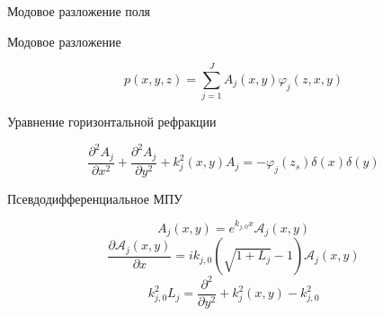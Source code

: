 \documentclass[10pt, unicode]{beamer}
\newif\ifmetropolis
\newcommand{\pa}[1]{\left(#1\right)}
\begin{document}
    \begin{frame}[fragile]{Модовое разложение поля}
        \begin{block}{Модовое разложение}
            \ifmetropolis
                \smallskip
            \fi
            \begin{equation}
                p\pa{x,y,z}=\sum\limits_{j=1}^JA_j\pa{x,y}\varphi_j\pa{z,x,y}
            \end{equation}
        \end{block}
        \begin{block}{Уравнение горизонтальной рефракции}
            \ifmetropolis
                \smallskip
            \fi
            \begin{equation}
                \frac{\partial^2 A_j}{\partial x^2} + \frac{\partial^2 A_j}{\partial y^2}+k_j^2 (x,y)A_j=-\varphi_j(z_s)\delta(x)\delta(y)
            \end{equation}
        \end{block}
        \begin{block}{Псевдодифференциальное МПУ}
            \ifmetropolis
                \smallskip
            \fi
            \begin{equation}
                A_j\pa{x,y}=e^{k_{j,0}x}\mathcal{A}_j\pa{x,y}
            \end{equation}
            \begin{equation}
                \frac{\partial\mathcal{A}_j\pa{x,y}}{\partial x}=ik_{j,0}\pa{\sqrt{1+L_j}-1}\mathcal{A}_j\pa{x,y}
            \end{equation}
            \begin{equation}
                k_{j,0}^2L_j=\frac{\partial^2}{\partial y^2}+k_j^2\pa{x,y}-k_{j,0}^2\nonumber
            \end{equation}
        \end{block}
    \end{frame}
\end{document}
